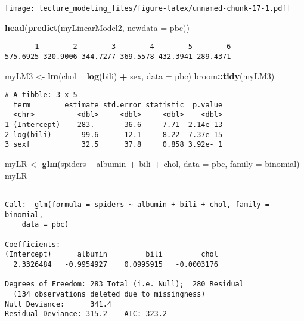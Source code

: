 \documentclass[12pt,letterpaperpaper,openany]{book}
\newenvironment{Shaded}{\begin{snugshade}}{\end{snugshade}}
\newcommand{\DataTypeTok}[1]{\textcolor[rgb]{0.13,0.29,0.53}{#1}}
\newcommand{\KeywordTok}[1]{\textcolor[rgb]{0.13,0.29,0.53}{\textbf{#1}}}
\newcommand{\NormalTok}[1]{#1}
\newcommand{\OperatorTok}[1]{\textcolor[rgb]{0.81,0.36,0.00}{\textbf{#1}}}
\newcommand{\StringTok}[1]{\textcolor[rgb]{0.31,0.60,0.02}{#1}}
\begin{document}
\texttt{[image: lecture\_modeling\_files/figure-latex/unnamed-chunk-17-1.pdf]}

\begin{Shaded}
\begin{Highlighting}[]
\KeywordTok{head}\NormalTok{(}\KeywordTok{predict}\NormalTok{(myLinearModel2, }\DataTypeTok{newdata =}\NormalTok{ pbc))}
\end{Highlighting}
\end{Shaded}

\begin{verbatim}
       1        2        3        4        5        6 
575.6925 320.9006 344.7277 369.5578 432.3941 289.4371 
\end{verbatim}

\begin{Shaded}
\begin{Highlighting}[]
\NormalTok{myLM3 <-}\StringTok{ }\KeywordTok{lm}\NormalTok{(chol }\OperatorTok{~}\StringTok{ }\KeywordTok{log}\NormalTok{(bili) }\OperatorTok{+}\StringTok{ }\NormalTok{sex, }\DataTypeTok{data =}\NormalTok{ pbc)}
\NormalTok{broom}\OperatorTok{::}\KeywordTok{tidy}\NormalTok{(myLM3)}
\end{Highlighting}
\end{Shaded}

\begin{verbatim}
# A tibble: 3 x 5
  term        estimate std.error statistic  p.value
  <chr>          <dbl>     <dbl>     <dbl>    <dbl>
1 (Intercept)    283.       36.6     7.71  2.14e-13
2 log(bili)       99.6      12.1     8.22  7.37e-15
3 sexf            32.5      37.8     0.858 3.92e- 1
\end{verbatim}

\begin{Shaded}
\begin{Highlighting}[]
\NormalTok{myLR <-}\StringTok{ }\KeywordTok{glm}\NormalTok{(spiders }\OperatorTok{~}\StringTok{ }\NormalTok{albumin }\OperatorTok{+}\StringTok{ }\NormalTok{bili }\OperatorTok{+}\StringTok{ }\NormalTok{chol, }\DataTypeTok{data =}\NormalTok{ pbc, }\DataTypeTok{family =}\NormalTok{ binomial)}
\NormalTok{myLR}
\end{Highlighting}
\end{Shaded}

\begin{verbatim}

Call:  glm(formula = spiders ~ albumin + bili + chol, family = binomial, 
    data = pbc)

Coefficients:
(Intercept)      albumin         bili         chol  
  2.3326484   -0.9954927    0.0995915   -0.0003176  

Degrees of Freedom: 283 Total (i.e. Null);  280 Residual
  (134 observations deleted due to missingness)
Null Deviance:      341.4 
Residual Deviance: 315.2    AIC: 323.2
\end{verbatim}
\end{document}
